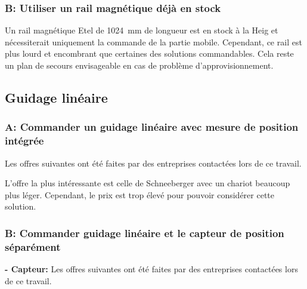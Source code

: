 \subsubsection{B: Utiliser un rail magnétique déjà en stock}
Un rail magnétique Etel \cite{Etel} de 1024~mm de longueur est en stock à la \acrshort{Heig} et nécessiterait uniquement la commande de la partie mobile. Cependant, ce
rail est plus lourd et encombrant que certaines des solutions commandables. Cela reste un plan de secours envisageable en cas de problème d'approvisionnement.

\subsection{Guidage linéaire}
\subsubsection{A: Commander un guidage linéaire avec mesure de position intégrée}
Les offres suivantes ont été faites par des entreprises contactées lors de ce travail.

\begin{table}[H]
    \centering
    \caption{Offres pour le guidage linéaire avec mesure de position}
    \label{tab:OffreGuidPos}
\end{table}

L'offre la plus intéressante est celle de Schneeberger \cite{Schneeberger} avec un chariot beaucoup plus léger. Cependant, le prix est trop élevé pour pouvoir considérer cette solution.

\subsubsection{B: Commander guidage linéaire et le capteur de position séparément}
\textbf{ - Capteur:}
\newline
Les offres suivantes ont été faites par des entreprises contactées lors de ce travail.

